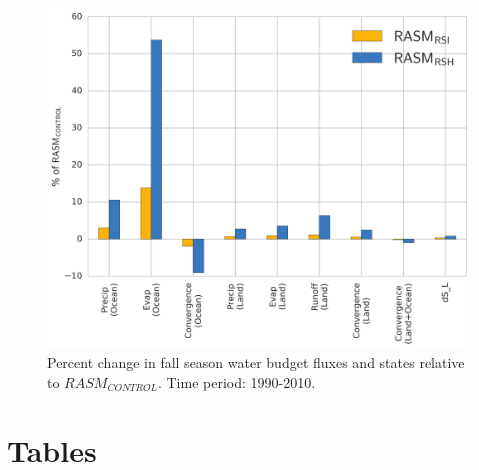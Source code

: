 \documentclass[draft]{agujournal}
\begin{document}
\clearpage
\begin{figure}
    \centering
    \includegraphics[width=16cm,keepaspectratio]{water_budget_relative}
    \caption{Percent change in fall season water budget fluxes and states relative to $RASM_{CONTROL}$.
    Time period: 1990-2010.}
    \label{fig:relative_fwb_change_sup}
\end{figure}

\clearpage
\section{Tables}
\end{document}
